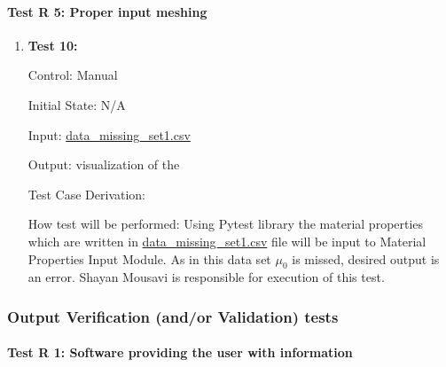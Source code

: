\documentclass[12pt, titlepage]{article}
\begin{document}
\paragraph{Test R 5: Proper input meshing }
\begin{enumerate}
	
\item{\textbf{Test 10:} \\}

Control: Manual

Initial State: N/A

Input: \href{https://github.com/shmouses/SPDFM/blob/master/src/TestCase/data_missing_set1.csv}{data\_missing\_set1.csv} 

Output: visualization of the 

Test Case Derivation: 

How test will be performed: Using Pytest library the material properties which are written in \href{https://github.com/shmouses/SPDFM/blob/master/src/TestCase/data_missing_set1.csv}{data\_missing\_set1.csv} file will be input to Material Properties Input Module. As in this data set $\mu_0$ is missed, desired output is an error. Shayan Mousavi is responsible for execution of this test.  
	
	
\end{enumerate}

\subsubsection{Output Verification (and/or Validation) tests}
\paragraph{Test R 1: Software providing the user with information }
\end{document}
